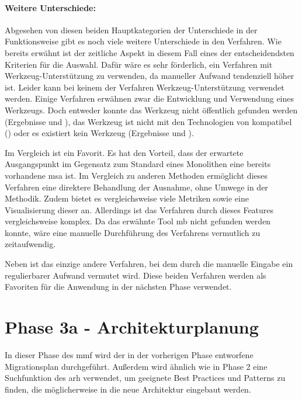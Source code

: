 \paragraph{Weitere Unterschiede:} Abgesehen von diesen beiden Hauptkategorien der Unterschiede in der Funktionsweise gibt es noch viele weitere Unterschiede in den Verfahren.
Wie bereits erwähnt ist der zeitliche Aspekt in diesem Fall eines der entscheidendsten Kriterien für die Auswahl.
Dafür wäre es sehr förderlich, ein Verfahren mit Werkzeug-Unterstützung zu verwenden, da manueller Aufwand tendenziell höher ist.
Leider kann bei keinem der Verfahren Werkzeug-Unterstützung verwendet werden.
Einige Verfahren erwähnen zwar die Entwicklung und Verwendung eines Werkzeugs.
Doch entweder konnte das Werkzeug nicht öffentlich gefunden werden (Ergebnisse  und ), das Werkzeug ist nicht mit den Technologien von \jf kompatibel () oder es existiert kein Werkzeug (Ergebnisse  und ).

Im Vergleich ist  ein Favorit.
Es hat den Vorteil, dass der erwartete Aus\-gangs\-punkt im Gegensatz zum Standard eines Monolithen eine bereits vorhandene \gls{msa} ist.
Im Vergleich zu anderen Methoden ermöglicht dieses Verfahren eine direktere Behandlung der Ausnahme, ohne Umwege in der Methodik.
Zudem bietet es vergleichsweise viele Metriken sowie eine Visualisierung dieser an.
Allerdings ist das Verfahren durch dieses Features vergleichsweise komplex.
Da das erwähnte Tool \gls{mb} nicht gefunden werden konnte, wäre eine manuelle Durchführung des Verfahrens vermutlich zu zeitaufwendig.

Neben  ist  das einzige andere Verfahren, bei dem durch die manuelle Eingabe ein regulierbarer Aufwand vermutet wird.
Diese beiden Verfahren werden als Favoriten für die Anwendung in der nächsten Phase verwendet.

\section{Phase 3a - Architekturplanung}
\label{sec:durchführung-phase3}

In dieser Phase des \acrfull{mmf} wird der in der vorherigen Phase entworfene Migrationsplan durchgeführt.
Außerdem wird ähnlich wie in Phase 2 eine Suchfunktion des \gls{arh} verwendet, um geeignete Best Practices und Patterns zu finden, die möglicherweise in die neue Architektur eingebaut werden.

